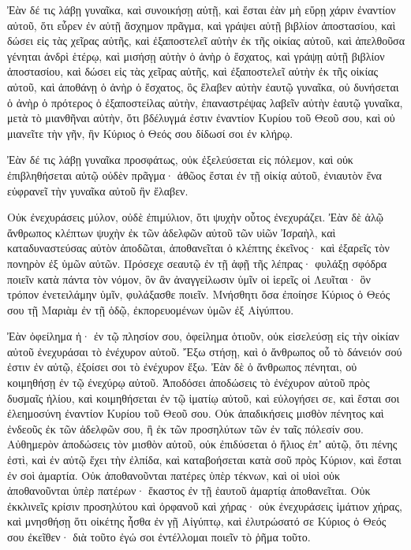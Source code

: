 {Ἐὰν δέ τις λάβῃ γυναῖκα, καὶ συνοικήσῃ αὐτῇ, καὶ ἔσται ἐὰν μὴ εὕρῃ χάριν ἐναντίον αὐτοῦ, ὅτι εὗρεν ἐν αὐτῇ ἄσχημον πρᾶγμα, καὶ γράψει αὐτῇ βιβλίον ἀποστασίου, καὶ δώσει εἰς τὰς χεῖρας αὐτῆς, καὶ ἐξαποστελεῖ αὐτὴν ἐκ τῆς οἰκίας αὐτοῦ,
καὶ ἀπελθοῦσα γένηται ἀνδρὶ ἑτέρῳ,
καὶ μισήσῃ αὐτὴν ὁ ἀνὴρ ὁ ἔσχατος, καὶ γράψῃ αὐτῇ βιβλίον ἀποστασίου, καὶ δώσει εἰς τὰς χεῖρας αὐτῆς, καὶ ἐξαποστελεῖ αὐτὴν ἐκ τῆς οἰκίας αὐτοῦ, καὶ ἀποθάνῃ ὁ ἀνὴρ ὁ ἔσχατος, ὃς ἔλαβεν αὐτὴν ἐαυτῷ γυναῖκα,
οὐ δυνήσεται ὁ ἀνὴρ ὁ πρότερος ὁ ἐξαποστείλας αὐτὴν, ἐπαναστρέψας λαβεῖν αὐτὴν ἑαυτῷ γυναῖκα, μετὰ τὸ μιανθῆναι αὐτὴν, ὅτι βδέλυγμά ἐστιν ἐναντίον Κυρίου τοῦ Θεοῦ σου, καὶ οὐ μιανεῖτε τὴν γῆν, ἣν Κύριος ὁ Θεός σου δίδωσί σοι ἐν κλήρῳ.
\par }{\PP {}Ἐὰν δέ τις λάβῃ γυναῖκα προσφάτως, οὐκ ἐξελεύσεται εἰς πόλεμον, καὶ οὐκ ἐπιβληθήσεται αὐτῷ οὐδὲν πρᾶγμα· ἀθῶος ἔσται ἐν τῇ οἰκίᾳ αὐτοῦ, ἐνιαυτὸν ἕνα εὐφρανεῖ τὴν γυναῖκα αὐτοῦ ἣν ἔλαβεν.
\par }{\PP {}Οὐκ ἐνεχυράσεις μύλον, οὐδὲ ἐπιμύλιον, ὅτι ψυχὴν οὗτος ἐνεχυράζει.
Ἐὰν δὲ ἁλῷ ἄνθρωπος κλέπτων ψυχὴν ἐκ τῶν ἀδελφῶν αὐτοῦ τῶν υἱῶν Ἰσραὴλ, καὶ καταδυναστεύσας αὐτὸν ἀποδῶται, ἀποθανεῖται ὁ κλέπτης ἐκεῖνος· καὶ ἐξαρεῖς τὸν πονηρὸν ἐξ ὑμῶν αὐτῶν.
Πρόσεχε σεαυτῷ ἐν τῇ ἁφῇ τῆς λέπρας· φυλάξῃ σφόδρα ποιεῖν κατὰ πάντα τὸν νόμον, ὃν ἂν ἀναγγείλωσιν ὑμῖν οἱ ἱερεῖς οἱ Λευῖται· ὃν τρόπον ἐνετειλάμην ὑμῖν, φυλάξασθε ποιεῖν.
Μνήσθητι ὅσα ἐποίησε Κύριος ὁ Θεός σου τῇ Μαριὰμ ἐν τῇ ὁδῷ, ἐκπορευομένων ὑμῶν ἐξ Αἰγύπτου.
\par }{\PP {}Ἐὰν ὀφείλημα ἠ· ἐν τῷ πλησίον σου, ὀφείλημα ὁτιοῦν, οὐκ εἰσελεύσῃ εἰς τὴν οἰκίαν αὐτοῦ ἐνεχυράσαι τὸ ἐνέχυρον αὐτοῦ.
Ἔξω στήσῃ, καὶ ὁ ἄνθρωπος οὗ τὸ δάνειόν σού ἐστιν ἐν αὐτῷ, ἐξοίσει σοι τὸ ἐνέχυρον ἔξω.
Ἐὰν δὲ ὁ ἄνθρωπος πένηται, οὐ κοιμηθήσῃ ἐν τῷ ἐνεχύρῳ αὐτοῦ.
Ἀποδόσει ἀποδώσεις τὸ ἐνέχυρον αὐτοῦ πρὸς δυσμαῖς ἡλίου, καὶ κοιμηθήσεται ἐν τῷ ἱματίῳ αὐτοῦ, καὶ εὐλογήσει σε, καὶ ἔσται σοι ἐλεημοσύνη ἐναντίον Κυρίου τοῦ Θεοῦ σου.
Οὐκ ἀπαδικήσεις μισθὸν πένητος καὶ ἐνδεοῦς ἐκ τῶν ἀδελφῶν σου, ἢ ἐκ τῶν προσηλύτων τῶν ἐν ταῖς πόλεσίν σου.
Αὐθημερὸν ἀποδώσεις τὸν μισθὸν αὐτοῦ, οὐκ ἐπιδύσεται ὁ ἥλιος ἐπʼ αὐτῷ, ὅτι πένης ἐστὶ, καὶ ἐν αὐτῷ ἔχει τὴν ἐλπίδα, καὶ καταβοήσεται κατὰ σοῦ πρὸς Κύριον, καὶ ἔσται ἐν σοὶ ἁμαρτία.
Οὐκ ἀποθανοῦνται πατέρες ὑπὲρ τέκνων, καὶ οἱ υἱοὶ οὐκ ἀποθανοῦνται ὑπὲρ πατέρων· ἕκαστος ἐν τῇ ἑαυτοῦ ἁμαρτίᾳ ἀποθανεῖται.
Οὐκ ἐκκλινεῖς κρίσιν προσηλύτου καὶ ὀρφανοῦ καὶ χήρας·
οὐκ ἐνεχυράσεις ἱμάτιον χήρας, καὶ μνησθήσῃ ὅτι οἰκέτης ἦσθα ἐν γῇ Αἰγύπτῳ, καὶ ἐλυτρώσατό σε Κύριος ὁ Θεός σου ἐκεῖθεν· διὰ τοῦτο ἐγώ σοι ἐντέλλομαι ποιεῖν τὸ ῥῆμα τοῦτο.
}
